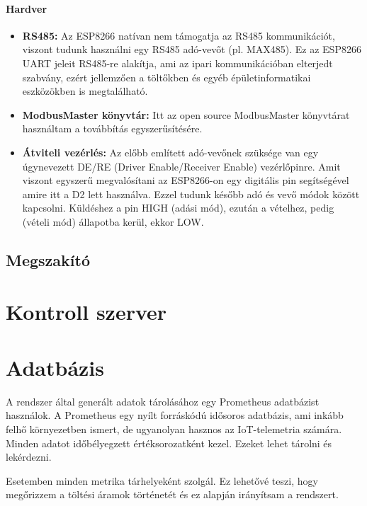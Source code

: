 \paragraph{Hardver}

\begin{itemize}
    \item \textbf{RS485:}
    Az ESP8266 natívan nem támogatja az RS485 kommunikációt, viszont tudunk használni egy RS485 adó-vevőt 
    (pl. MAX485). Ez az ESP8266 UART jeleit RS485-re alakítja, ami az ipari kommunikációban elterjedt szabvány, 
    ezért jellemzően a töltőkben és egyéb épületinformatikai eszközökben is megtalálható.
    \item \textbf{ModbusMaster könyvtár:}
    Itt az open source ModbusMaster könyvtárat \cite{ModbusMaster} használtam a továbbítás egyszerűsítésére.
    \item \textbf{Átviteli vezérlés:}
    Az előbb említett adó-vevőnek szüksége van egy úgynevezett DE/RE (Driver Enable/Receiver Enable) vezérlőpinre. 
    Amit viszont egyszerű megvalósítani az ESP8266-on egy digitális pin segítségével amire itt a D2 lett használva. 
    Ezzel tudunk később adó és vevő módok között kapcsolni. Küldéshez a pin HIGH (adási mód), ezután a 
    vételhez, pedig (vételi mód) állapotba kerül, ekkor LOW.
\end{itemize}


\subsection{Megszakító}

\section{Kontroll szerver}

\section{Adatbázis}

A rendszer által generált adatok tárolásához egy Prometheus adatbázist használok. 
A Prometheus egy nyílt forráskódú idősoros adatbázis, ami inkább felhő környezetben ismert, 
de ugyanolyan hasznos az IoT-telemetria számára. Minden adatot időbélyegzett értéksorozatként kezel.
Ezeket lehet tárolni és lekérdezni.
\cite{electrofunsmart:iotserver}
\cite{prometheus:dimenzionális}

Esetemben minden metrika tárhelyeként szolgál. Ez lehetővé teszi, 
hogy megőrizzem a töltési áramok történetét és ez alapján irányítsam a rendszert.

